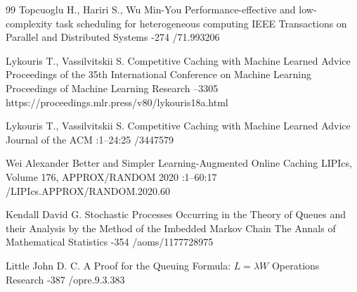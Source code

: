 \begin{thebibliography}{99}
\by Topcuoglu H., Hariri S., Wu Min-You
\paper Performance-effective and low-complexity task scheduling for heterogeneous computing
\jour IEEE Transactions on Parallel and Distributed Systems
-274
/71.993206

\by Lykouris T., Vassilvitskii S.
\paper Competitive Caching with Machine Learned Advice
\inbook Proceedings of the 35th International Conference on Machine Learning
\serial Proceedings of Machine Learning Research
--3305
\URL https://proceedings.mlr.press/v80/lykouris18a.html

\by Lykouris T., Vassilvitskii S.
\paper Competitive Caching with Machine Learned Advice
\jour Journal of the ACM
:1--24:25
/3447579

\by Wei Alexander
\paper Better and Simpler Learning-Augmented Online Caching
\jour LIPIcs, Volume 176, APPROX/RANDOM 2020
:1--60:17
/LIPIcs.APPROX/RANDOM.2020.60

\by Kendall David G.
\paper Stochastic Processes Occurring in the Theory of Queues and their Analysis by the Method of the Imbedded Markov Chain
\jour The Annals of Mathematical Statistics
-354
/aoms/1177728975

\by Little John D. C.
\paper A Proof for the Queuing Formula: $L=\lambda W$
\jour Operations Research
-387
/opre.9.3.383

\end{thebibliography}
